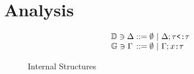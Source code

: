 \documentclass[acmsmall]{acmart}
\begin{document}



\section{Analysis}



\begin{figure*}[h]
\[
\begin{array}{l @{} l}
  \mathbb{D} \owns \Delta 
  &{} ::=
  \begin{array}[t]{@{} l}
    \emptyset 
    \ |\ 
    \Delta; \code{$\tau$<:$\tau$}
  \end{array}
  \\
  \mathbb{G} \owns \Gamma 
  &{} ::=
  \begin{array}[t]{@{} l}
    \emptyset 
    \ |\ 
    \Gamma; \code{$x$:$\tau$}
  \end{array}
\end{array}
\]

\caption{Internal Structures}
\end{figure*}


\end{document}

